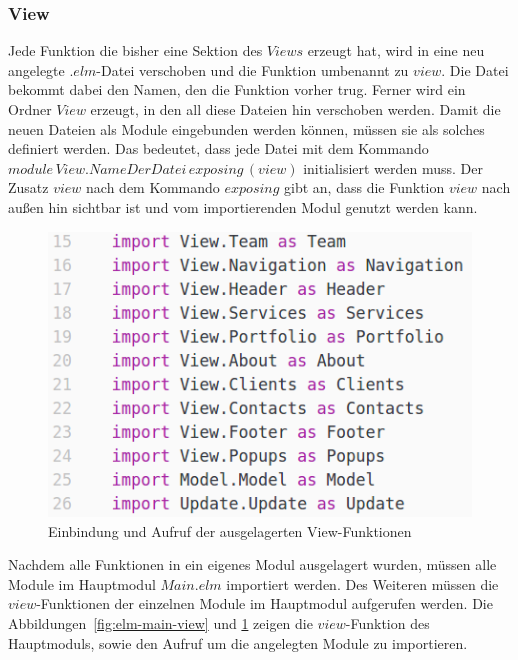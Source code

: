 \subsubsection{View}
\label{sec:auslagern-view}
Jede Funktion die bisher eine Sektion des $Views$ erzeugt hat, wird in eine neu angelegte $.elm$-Datei verschoben und die Funktion umbenannt zu $view$. Die Datei bekommt dabei den Namen, den die Funktion vorher trug. Ferner wird ein Ordner $View$ erzeugt, in den all diese Dateien hin verschoben werden. Damit die neuen Dateien als Module eingebunden werden können, müssen sie als solches definiert werden. Das bedeutet, dass jede Datei mit dem Kommando $module\,View.NameDerDatei\,exposing\,(view)$ initialisiert werden muss. Der Zusatz $view$ nach dem Kommando $exposing$ gibt an, dass die Funktion $view$ nach außen hin sichtbar ist und vom importierenden Modul genutzt werden kann.
\begin{figure}[hbt]
\centering
\includegraphics[scale=0.5]{img/imports-main.png}
\caption{Einbindung und Aufruf der ausgelagerten View-Funktionen}\label{fig:elm-main-view-imports}
\end{figure}
Nachdem alle Funktionen in ein eigenes Modul ausgelagert wurden, müssen alle Module im Hauptmodul $Main.elm$ importiert werden. Des Weiteren müssen die $view$-Funktionen der einzelnen Module im Hauptmodul aufgerufen werden. Die Abbildungen~\ref{fig:elm-main-view} und \ref{fig:elm-main-view-imports} zeigen die $view$-Funktion des Hauptmoduls, sowie den Aufruf um die angelegten Module zu importieren.
